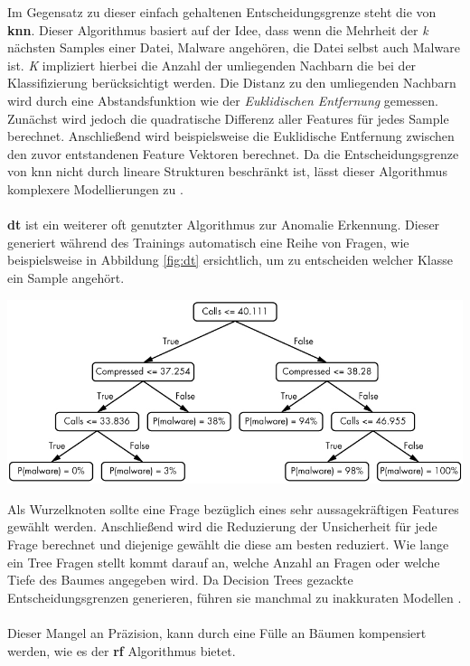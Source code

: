 \documentclass[
    12pt, %
    DIV10,
    ngerman, %
    a4paper, %
    oneside, %
    titlepage, %
    parskip=half, %
    headings=normal, %
    listof=totoc, %
    bibliography=totoc, %
    index=totoc, %
    captions=tableheading, %
    final %
]{scrreprt}
\begin{document}
Im Gegensatz zu dieser einfach gehaltenen Entscheidungsgrenze steht die von \textbf{\acl{knn}}. Dieser Algorithmus basiert auf der Idee, dass wenn die Mehrheit der \emph{k} nächsten Samples einer Datei, Malware angehören, die Datei selbst auch Malware ist. \emph{K} impliziert hierbei die Anzahl der umliegenden Nachbarn die bei der Klassifizierung berücksichtigt werden. Die Distanz zu den umliegenden Nachbarn wird durch eine Abstandsfunktion wie der \emph{Euklidischen Entfernung} gemessen. Zunächst wird jedoch die quadratische Differenz aller Features für jedes Sample berechnet. Anschließend wird beispielsweise die Euklidische Entfernung zwischen den zuvor entstandenen Feature Vektoren berechnet. Da die Entscheidungsgrenze von \ac{knn} nicht durch lineare Strukturen beschränkt ist, lässt dieser Algorithmus komplexere Modellierungen zu \parencite{JoshuaSaxe2018}.
\\\\
\textbf{\acl{dt}} ist ein weiterer oft genutzter Algorithmus zur Anomalie Erkennung. Dieser generiert während des Trainings automatisch eine Reihe von Fragen, wie beispielsweise in Abbildung \ref{fig:dt} ersichtlich, um zu entscheiden welcher Klasse ein Sample angehört.
\begin{center}
\includegraphics[scale=0.4]{img/dt.png}
\label{fig:dt}
\end{center}
Als Wurzelknoten sollte eine Frage bezüglich eines sehr aussagekräftigen Features gewählt werden. Anschließend wird die Reduzierung der Unsicherheit für jede Frage berechnet und diejenige gewählt die diese am besten reduziert. 
Wie lange ein Tree Fragen stellt kommt darauf an, welche Anzahl an Fragen oder welche Tiefe des Baumes angegeben wird.
Da Decision Trees gezackte Entscheidungsgrenzen generieren, führen sie manchmal zu inakkuraten Modellen \parencite{JoshuaSaxe2018}.
\\\\
Dieser Mangel an Präzision, kann durch eine Fülle an Bäumen kompensiert werden, wie es der \textbf{\acl{rf}} Algorithmus bietet.
\end{document}
